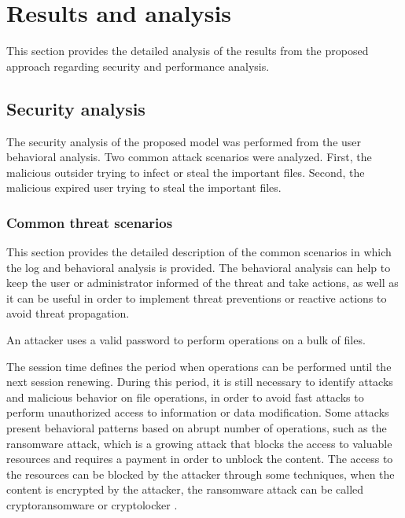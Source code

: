 \section{Results and analysis}
\label{sec:3_results}

This section provides the detailed analysis of the results from the proposed approach regarding security and performance analysis.

\subsection{Security analysis}
\label{sec:3_sec_analysis}
The security analysis of the proposed model was performed from the user behavioral analysis. Two common attack scenarios were analyzed. First, the malicious outsider trying to infect or steal the important files. Second, the malicious expired user trying to steal the important files. 

\subsubsection{Common threat scenarios}
\label{sec:3_common}
This section provides the detailed description of the common scenarios in which the log and behavioral analysis is provided. The behavioral analysis can help to keep the user or administrator informed of the threat and take actions, as well as it can be useful in order to implement threat preventions or reactive actions to avoid threat propagation.

\begin{thm}
	An attacker uses a valid password to perform operations on a bulk of files.
\end{thm}

The session time defines the period when operations can be performed until the next session renewing. During this period, it is still necessary to identify attacks and malicious behavior on file operations, in order to avoid fast attacks to perform unauthorized access to information or data modification. Some attacks present behavioral patterns based on abrupt number of operations, such as the ransomware attack, which is a growing attack \cite{McAfee2015} that blocks the access to valuable resources and requires a payment in order to unblock the content. The access to the resources can be blocked by the attacker through some techniques, when the content is encrypted by the attacker, the ransomware attack can be called cryptoransomware or cryptolocker \cite{kaspersky2014}.

